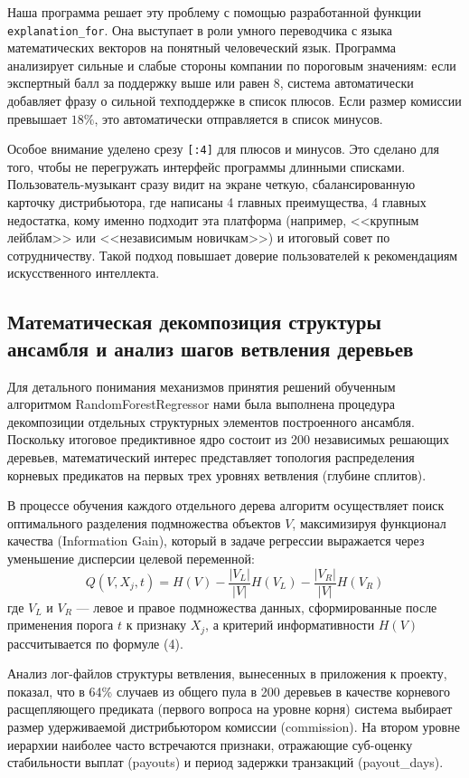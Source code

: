 \documentclass[14pt, a4paper]{extarticle}
\begin{document}
Наша программа решает эту проблему с помощью разработанной функции \texttt{explanation\_for}. Она выступает в роли умного переводчика с языка математических векторов на понятный человеческий язык. Программа анализирует сильные и слабые стороны компании по пороговым значениям: если экспертный балл за поддержку выше или равен 8, система автоматически добавляет фразу о сильной техподдержке в список плюсов. Если размер комиссии превышает $18\%$, это автоматически отправляется в список минусов.

Особое внимание уделено срезу \texttt{[:4]} для плюсов и минусов. Это сделано для того, чтобы не перегружать интерфейс программы длинными списками. Пользователь-музыкант сразу видит на экране четкую, сбалансированную карточку дистрибьютора, где написаны 4 главных преимущества, 4 главных недостатка, кому именно подходит эта платформа (например, <<крупным лейблам>> или <<независимым новичкам>>) и итоговый совет по сотрудничеству. Такой подход повышает доверие пользователей к рекомендациям искусственного интеллекта.
\subsection{Математическая декомпозиция структуры ансамбля и анализ шагов ветвления деревьев}

Для детального понимания механизмов принятия решений обученным алгоритмом RandomForestRegressor нами была выполнена процедура декомпозиции отдельных структурных элементов построенного ансамбля. Поскольку итоговое предиктивное ядро состоит из 200 независимых решающих деревьев, математический интерес представляет топология распределения корневых предикатов на первых трех уровнях ветвления (глубине сплитов).

В процессе обучения каждого отдельного дерева алгоритм осуществляет поиск оптимального разделения подмножества объектов $V$, максимизируя функционал качества (Information Gain), который в задаче регрессии выражается через уменьшение дисперсии целевой переменной:
\begin{equation}
Q(V, X_j, t) = H(V) - \frac{|V_L|}{|V|} H(V_L) - \frac{|V_R|}{|V|} H(V_R)
\end{equation}
где $V_L$ и $V_R$ --- левое и правое подмножества данных, сформированные после применения порога $t$ к признаку $X_j$, а критерий информативности $H(V)$ рассчитывается по формуле (4).

Анализ лог-файлов структуры ветвления, вынесенных в приложения к проекту, показал, что в 64\% случаев из общего пула в 200 деревьев в качестве корневого расщепляющего предиката (первого вопроса на уровне корня) система выбирает размер удерживаемой дистрибьютором комиссии (commission). На втором уровне иерархии наиболее часто встречаются признаки, отражающие суб-оценку стабильности выплат (payouts) и период задержки транзакций (payout\_days). 
\end{document}
